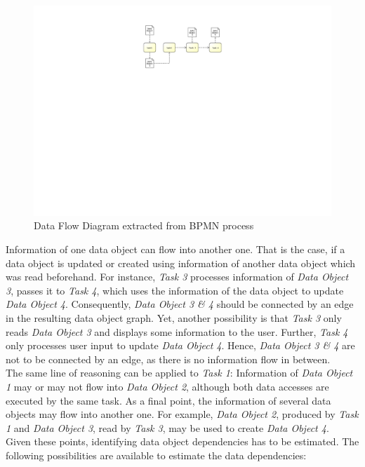 \begin{figure}[h!]
	\centering
	\includegraphics[width=\textwidth, trim={10cm 14.5cm 10cm 2cm}]{img/DataFlowExample.pdf}
	\caption{Data Flow Diagram extracted from BPMN process}
	\label{fig:dataFlowExample}
\end{figure}

Information of one data object can flow into another one. That is the case, if a data object is updated or created using information of another data object which was read beforehand. 
For instance, \textit{Task 3} processes information of \textit{Data Object 3}, passes it to \textit{Task 4}, which uses the information of the data object to update \textit{Data Object 4}. Consequently, \textit{Data Object 3 \& 4} should be connected by an edge in the resulting data object graph. Yet, another possibility is that \textit{Task 3} only reads \textit{Data Object 3} and displays some information to the user. Further, \textit{Task 4} only processes user input to update \textit{Data Object 4}. Hence, \textit{Data Object 3 \& 4} are not to be connected by an edge, as there is no information flow in between. \\
The same line of reasoning can be applied to \textit{Task 1}: Information of \textit{Data Object 1} may or may not flow into \textit{Data Object 2}, although both data accesses are executed by the same task. As a final point, the information of several data objects may flow into another one. For example, \textit{Data Object 2}, produced by \textit{Task 1} and \textit{Data Object 3}, read by \textit{Task 3}, may be used to create \textit{Data Object 4}.\\
Given these points, identifying data object dependencies has to be estimated. The following possibilities are available to estimate the data dependencies:

